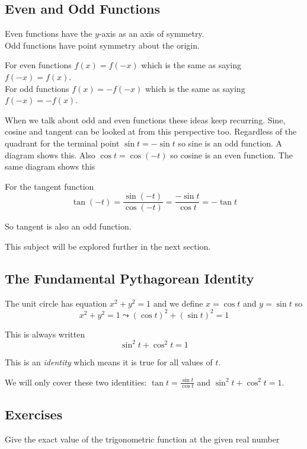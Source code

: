 \subsection{Even and Odd Functions}
Even functions have the $y$-axis as an axis of symmetry. \\\relax Odd functions have point symmetry about
the origin. 

For even functions $f (x) =f ( -x)$ which is the same as saying $f ( -x) =f (x)$. \\\relax For odd functions $f (x) = -f ( -x)$ which is the same as saying $f ( -x) = -f (x)$. 

When we talk about odd and even functions these ideas keep recurring. Sine,
cosine and tangent can be looked at from this perspective too. Regardless of the quadrant for the terminal point
$\sin  t = -\sin  t$ so sine is an odd function. A diagram shows this. Also
$\cos  t =\cos  ( -t)$ so cosine is an even function. The same diagram shows this 

For the
tangent function
\begin{equation*}\tan  ( -t) =\frac{\sin  ( -t)}{\cos  ( -t)} =\frac{ -\sin  t}{\cos  t} = -\tan  t
\end{equation*}

So tangent is also an odd function. 

This subject will be explored further in
the next section. 

\subsection{The Fundamental Pythagorean Identity}
The unit circle has equation $x^{2} +y^{2} =1$ and we define $x =\cos  t$ and $y =\sin  t$ so
\begin{equation*}x^{2} +y^{2} =1 \leadsto \left (\cos  t\right )^{2} +\left (\sin  t\right )^{2} =1
\end{equation*}

This is always written
\begin{equation*}\sin ^{2} t +\cos ^{2} t =1
\end{equation*}

This is an \emph{identity} which means it is true for all values of $t$. 

We will only cover these two identities: $\tan  t =\frac{\sin  t}{\cos  t}$ and $\sin ^{2} t +\cos ^{2} t =1$. 

\subsection{Exercises}
Give the exact value of the trigonometric function
at the given real number 


